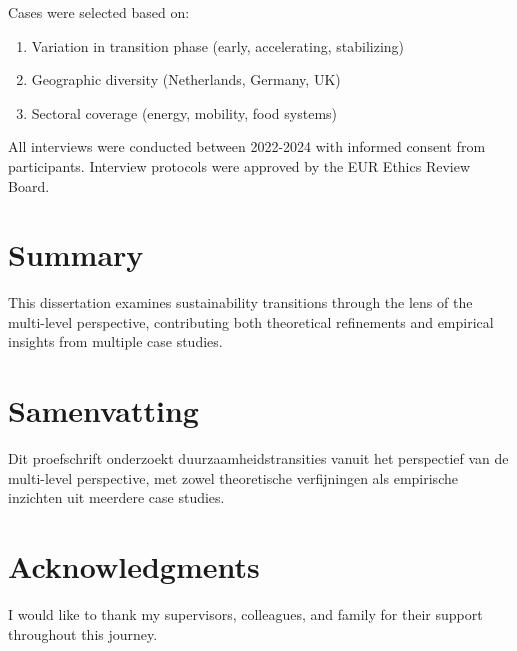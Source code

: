 \documentclass[
    fontsize=11pt,
    a4paper,
    twoside=true,
    open=any,
]{kaobook}
\begin{document}
Cases were selected based on:

\begin{enumerate}
    \item Variation in transition phase (early, accelerating, stabilizing)
    \item Geographic diversity (Netherlands, Germany, UK)
    \item Sectoral coverage (energy, mobility, food systems)
\end{enumerate}

\begin{eurboxgold}[title=Note on Data Collection]
All interviews were conducted between 2022-2024 with informed consent from participants. Interview protocols were approved by the EUR Ethics Review Board.
\end{eurboxgold}


\backmatter

\chapter*{Summary}

This dissertation examines sustainability transitions through the lens of the multi-level perspective, contributing both theoretical refinements and empirical insights from multiple case studies.

\chapter*{Samenvatting}

Dit proefschrift onderzoekt duurzaamheidstransities vanuit het perspectief van de multi-level perspective, met zowel theoretische verfijningen als empirische inzichten uit meerdere case studies.

\chapter*{Acknowledgments}

I would like to thank my supervisors, colleagues, and family for their support throughout this journey.


\end{document}
